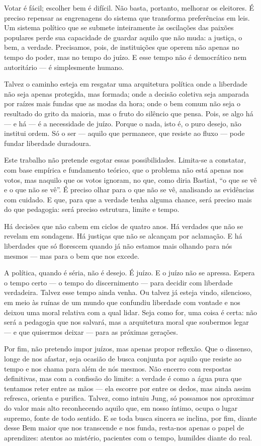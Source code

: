 \begin{apendicesenv}
Votar é fácil; escolher bem é difícil. Não basta, portanto, melhorar os eleitores. É preciso repensar as engrenagens do sistema que transforma preferências em leis. Um sistema político que se submete inteiramente às oscilações das paixões populares perde sua capacidade de guardar aquilo que não muda: a justiça, o bem, a verdade. Precisamos, pois, de instituições que operem não apenas no tempo do poder, mas no tempo do juízo. E esse tempo não é democrático nem autoritário — é simplesmente humano.

Talvez o caminho esteja em resgatar uma arquitetura política onde a liberdade não seja apenas protegida, mas formada; onde a decisão coletiva seja amparada por raízes mais fundas que as modas da hora; onde o bem comum não seja o resultado do grito da maioria, mas o fruto do silêncio que pensa. Pois, se algo há — e há — é a necessidade de juízo. Porque o nada, isto é, o puro desejo, não institui ordem. Só o ser — aquilo que permanece, que resiste ao fluxo — pode fundar liberdade duradoura.

Este trabalho não pretende esgotar essas possibilidades. Limita-se a constatar, com base empírica e fundamento teórico, que o problema não está apenas nos votos, mas naquilo que os votos ignoram, no que, como diria Bastiat, “o que se vê e o que não se vê”. É preciso olhar para o que não se vê, analisando as evidências com cuidado. E que, para que a verdade tenha alguma chance, será preciso mais do que pedagogia: será preciso estrutura, limite e tempo.

Há decisões que não cabem em ciclos de quatro anos. Há verdades que não se revelam em sondagens. Há justiças que não se alcançam por aclamação. E há liberdades que só florescem quando já não estamos mais olhando para nós mesmos — mas para o bem que nos excede.

A política, quando é séria, não é desejo. É juízo. E o juízo não se apressa. Espera o tempo certo — o tempo do discernimento — para decidir com liberdade verdadeira. Talvez esse tempo ainda venha. Ou talvez já esteja vindo, silencioso, em meio às ruínas de um mundo que confundiu liberdade com vontade e nos deixou uma moral relativa com a qual lidar. Seja como for, uma coisa é certa: não será a pedagogia que nos salvará, mas a arquitetura moral que soubermos legar — e que quisermos deixar — para as próximas gerações.

Por fim, não pretendo impor juízos, mas apenas propor reflexão. Que o dissenso, longe de nos afastar, seja ocasião de busca conjunta por aquilo que resiste ao tempo e nos chama para além de nós mesmos. Não encerro com respostas definitivas, mas com a confissão do limite: a verdade é como a água pura que tentamos reter entre as mãos — ela escorre por entre os dedos, mas ainda assim refresca, orienta e purifica. Talvez, como intuiu Jung, só possamos nos aproximar do valor mais alto reconhecendo aquilo que, em nosso íntimo, ocupa o lugar supremo, fonte de todo sentido. E se toda busca sincera se inclina, por fim, diante desse Bem maior que nos transcende e nos funda, resta-nos apenas o papel de aprendizes: atentos ao mistério, pacientes com o tempo, humildes diante do real.


\end{apendicesenv}
